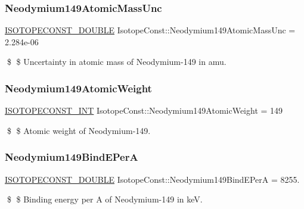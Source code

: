 \subsubsection{\texorpdfstring{Neodymium149\+Atomic\+Mass\+Unc}{Neodymium149AtomicMassUnc}}
{\footnotesize\ttfamily \mbox{\hyperlink{group___isotope_const-_macros_ga8f45a7272ce02c0b4c65c44636ed719a}{I\+S\+O\+T\+O\+P\+E\+C\+O\+N\+S\+T\+\_\+\+D\+O\+U\+B\+LE}} Isotope\+Const\+::\+Neodymium149\+Atomic\+Mass\+Unc = 2.\+284e-\/06}

\$ \$ Uncertainty in atomic mass of Neodymium-\/149 in amu. \mbox{\label{group___isotope_const-_neodymium-_nd149_ga4831a82bcad0592d4f752eb4a90e6da5}} 
\subsubsection{\texorpdfstring{Neodymium149\+Atomic\+Weight}{Neodymium149AtomicWeight}}
{\footnotesize\ttfamily \mbox{\hyperlink{group___isotope_const-_macros_ga5f18360b3e99483a35c32d789e62621c}{I\+S\+O\+T\+O\+P\+E\+C\+O\+N\+S\+T\+\_\+\+I\+NT}} Isotope\+Const\+::\+Neodymium149\+Atomic\+Weight = 149}

\$ \$ Atomic weight of Neodymium-\/149. \mbox{\label{group___isotope_const-_neodymium-_nd149_gaab0809038c1decc357431c2d8fe11bdd}} 
\subsubsection{\texorpdfstring{Neodymium149\+Bind\+E\+PerA}{Neodymium149BindEPerA}}
{\footnotesize\ttfamily \mbox{\hyperlink{group___isotope_const-_macros_ga8f45a7272ce02c0b4c65c44636ed719a}{I\+S\+O\+T\+O\+P\+E\+C\+O\+N\+S\+T\+\_\+\+D\+O\+U\+B\+LE}} Isotope\+Const\+::\+Neodymium149\+Bind\+E\+PerA = 8255.}

\$ \$ Binding energy per A of Neodymium-\/149 in keV. \mbox{\label{group___isotope_const-_neodymium-_nd149_ga56cf7fa94e98f03c90a071d4c2888714}} 
